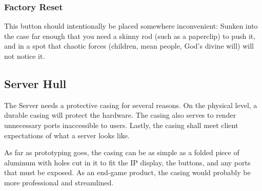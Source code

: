 \subsubsection{Factory Reset}
This button should intentionally be placed somewhere inconvenient: 
Sunken into the case far enough that you need a skinny rod (such as a paperclip) to push it, and in a spot
that chaotic forces (children, mean people, God's divine will) will not notice it.
	
\subsection{Server Hull}
The Server needs a protective casing for several reasons. 
On the physical level, a durable casing will protect the hardware. 
The casing also serves to render unnecessary ports inaccessible to users. 
Lastly, the casing shall meet client expectations of what a server looks like.

As far as prototyping goes, the casing can be as simple as a folded piece of aluminum
with holes cut in it to fit the \ac{IP} display, the buttons, and any ports that must be
exposed. As an end-game product, the casing would probably be more professional and streamlined.
